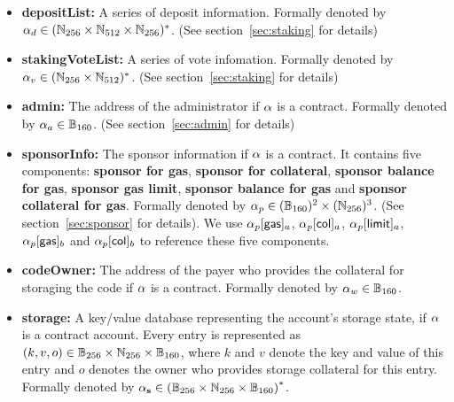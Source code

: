 \begin{itemize}[nosep]
	\item {\bf depositList:} A series of deposit information. Formally denoted by $\mathbf{\alpha}_d\in (\mathbb{N}_{256}\times \mathbb{N}_{512}\times \mathbb{N}_{256})^*$. (See section~\ref{sec:staking} for details)
	
	\item {\bf stakingVoteList:} A series of vote infomation. Formally denoted by $\mathbf{\alpha}_v\in (\mathbb{N}_{256}\times \mathbb{N}_{512})^*$. (See section~\ref{sec:staking} for details)
	
	\item {\bf admin:} The address of the administrator if $\mathbf{\alpha}$ is a contract.  Formally denoted by $\mathbf{\alpha}_a\in \mathbb{B}_{160}$. (See section~\ref{sec:admin} for details)
	
	\item {\bf sponsorInfo:} The sponsor information if $\mathbf{\alpha}$ is a contract. It contains five components: {\bf sponsor for gas}, {\bf sponsor for collateral}, {\bf sponsor balance for gas}, {\bf sponsor gas limit}, {\bf sponsor balance for gas} and {\bf sponsor collateral for gas}. Formally denoted by $\mathbf{\alpha}_p\in (\mathbb{B}_{160})^2\times (\mathbb{N}_{256})^3$. (See section~\ref{sec:sponsor} for details). We use $\mathbf{\alpha}_p[{\sf gas}]_a$, $\mathbf{\alpha}_p[{\sf col}]_a$, 
	$\mathbf{\alpha}_p[{\sf limit}]_a$, $\mathbf{\alpha}_p[{\sf gas}]_b$ and $\mathbf{\alpha}_p[{\sf col}]_b$ to reference these five components. 
	
	\item {\bf codeOwner:} The address of the payer who provides the collateral for storaging the code if $\mathbf{\alpha}$ is a contract. Formally denoted by $\mathbf{\alpha}_w\in \mathbb{B}_{160}$. 
	
	\item {\bf storage:} A key/value database representing the account's storage state, if $\mathbf{\alpha}$ is a contract account. 
	Every entry is represented as $(k,v,o)\in \mathbb{B}_{256}\times \mathbb{N}_{256}\times \mathbb{B}_{160}$, where $k$ and $v$ denote the key and value of this entry and $o$ denotes the owner who provides storage collateral for this entry.
	Formally denoted by $\mathbf{\alpha}_{\bf s} \in \left( \mathbb{B}_{256}\times \mathbb{N}_{256}\times \mathbb{B}_{160} \right)^*$.
	
\end{itemize}


